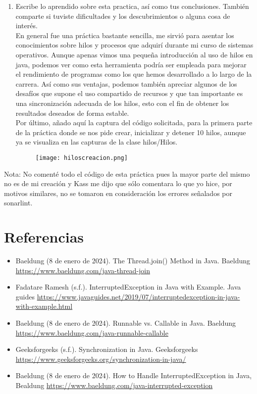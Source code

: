 \documentclass{article}
\begin{document}
\begin{enumerate}
    \item Escribe lo aprendido sobre esta practica, así como tus conclusiones. También comparte si tuviste dificultades y los descubrimientos o alguna cosa de interés.\\
    En general fue una práctica bastante sencilla, me sirvió para asentar los conocimientos sobre hilos y procesos que adquirí durante mi curso de sistemas operativos. Aunque apenas vimos una pequeña introducción al uso de hilos en java, podemos ver como esta herramienta podría ser empleada para mejorar el rendimiento de programas como los que hemos desarrollado a lo largo de la carrera. Así como sus ventajas, podemos también apreciar algunos de los desafíos que supone el uso compartido de recursos y que tan importante es una sincronización adecuada de los hilos, esto con el fin de obtener los resultados deseados de forma estable.\\
    Por último, añado aquí la captura del código solicitada, para la primera parte de la práctica donde se nos pide crear, inicializar y detener 10 hilos, aunque ya se visualiza en las capturas de la clase hilos/Hilos.
    \begin{figure}[!h]
            \centering
            \texttt{[image: hiloscreacion.png]}        
        \end{figure}
\end{enumerate}
\newpage
Nota: No comenté todo el código de esta práctica pues la mayor parte del mismo no es de mi creación y Kass me dijo que sólo comentara lo que yo hice, por motivos similares, no se tomaron en consideración los errores señalados por sonarlint.

\section*{Referencias}
\begin{itemize}
    \item Baeldung (8 de enero de 2024). The Thread.join() Method in Java. Baeldung \url{https://www.baeldung.com/java-thread-join}
    \item Fadatare Ramesh (s.f.). InterruptedException in Java with Example. Java guides \url{https://www.javaguides.net/2019/07/interruptedexception-in-java-with-example.html}
    \item Baeldung (8 de enero de 2024). Runnable vs. Callable in Java. Baeldung \url {https://www.baeldung.com/java-runnable-callable}
    \item Geeksforgeeks (s.f.). Synchronization in Java. Geeksforgeeks \url{https://www.geeksforgeeks.org/synchronization-in-java/}
    \item Baeldung (8 de enero de 2024). How to Handle InterruptedException in Java, Bealdung \url{https://www.baeldung.com/java-interrupted-exception}
\end{itemize}
\end{document}
